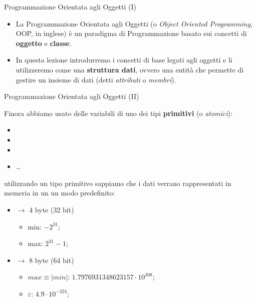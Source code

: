 \begin{frame}{Programmazione Orientata agli Oggetti (I)}
  
  \begin{itemize}
   \item La Programmazione Orientata agli Oggetti (o \emph{Object Oriented Programming}, OOP, in inglese)
         è un paradigma di Programmazione basato sui concetti di \textbf{oggetto} e \textbf{classe}.
   \item In questa lezione introdurremo i concetti di base legati agli oggetti e li utilizzeremo
         come una \textbf{struttura dati}, ovvero una entità che permette di gestire un insieme di
         dati (detti \emph{attributi} o \emph{membri}).
  \end{itemize}

\end{frame}

\begin{frame}{Programmazione Orientata agli Oggetti (II)}
  
  Finora \textbf{} abbiamo usato delle variabili di uno dei
  tipi \textbf{primitivi} (o \emph{atomici}):
  \begin{itemize}
    \item \texttt{}
    \item \texttt{}
    \item \texttt{}
    \item \dots
  \end{itemize}
  

  utilizzando un tipo primitivo sappiamo che i dati verrano rappresentati in memeria in un 
  un modo predefinito:
  \begin{itemize}
   \item \texttt{} $\rightarrow$ 4 byte (32 bit) 
   \begin{itemize}
    \item min: $-2^{31}$;
    \item max: $2^{31} - 1$;
   \end{itemize}

   \item \texttt{} $\rightarrow$ 8 byte (64 bit)
   \begin{itemize}
    \item $max \equiv |min|$: $1.7976931348623157 \cdot 10^{308}$;
    \item $\varepsilon$: $4.9 \cdot 10^{-324}$;
   \end{itemize}
  \end{itemize}

\end{frame}

